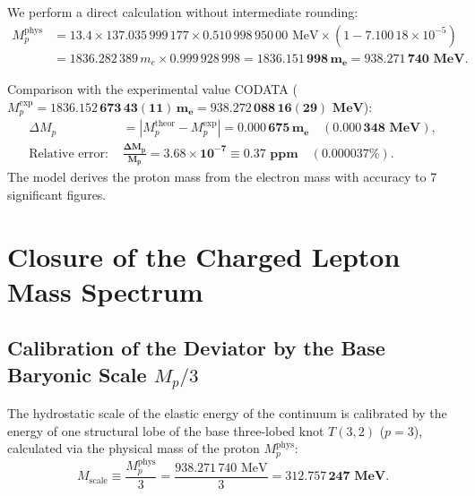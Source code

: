 \documentclass[12pt,a4paper]{article}
\begin{document}
	We perform a direct calculation without intermediate rounding:
	\begin{align}
	M_p^{\text{phys}} &= 13.4 \times 137.035\,999\,177 \times 0.510\,998\,950\,00 \text{ MeV} \times \left( 1 - 7.100\,18 \times 10^{-5} \right) \nonumber \\
	&= 1836.282\,389 \, m_e \times 0.999\,928\,998 = \mathbf{1836.151\,998 \, m_e} = \mathbf{938.271\,740 \text{ MeV}}.
	\end{align}
			
	Comparison with the experimental value CODATA ($M_p^{\text{exp}} = \mathbf{1836.152\,673\,43(11) \, m_e} = \mathbf{938.272\,088\,16(29) \text{ MeV}}$):
	\begin{align}
	\Delta M_p &= |M_p^{\text{theor}} - M_p^{\text{exp}}| = \mathbf{0.000\,675 \, m_e} \quad (\mathbf{0.000\,348 \text{ MeV}}), \\
	\text{Relative error: } &\mathbf{\frac{\Delta M_p}{M_p} = 3.68 \times 10^{-7} \equiv 0.37 \text{ ppm}} \quad (\mathbf{0.000037\%}).
	\end{align}
	The model derives the proton mass from the electron mass with accuracy to 7 significant figures.
		
\section{Closure of the Charged Lepton Mass Spectrum}
			
	\subsection{Calibration of the Deviator by the Base Baryonic Scale $M_p/3$}
	The hydrostatic scale of the elastic energy of the continuum is calibrated by the energy of one structural lobe of the base three-lobed knot $T(3,2)$ ($p=3$), calculated via the physical mass of the proton $M_p^{\text{phys}}$:
	\begin{equation}
	M_{\text{scale}} \equiv \frac{M_p^{\text{phys}}}{3} = \frac{938.271\,740 \text{ MeV}}{3} = \mathbf{312.757\,247 \text{ MeV}}.
	\end{equation}
			
\end{document}
